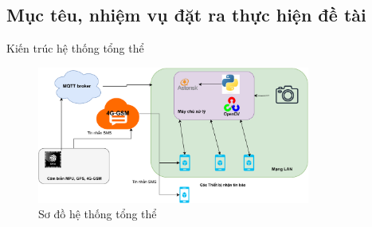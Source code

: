 \subsection{Mục têu, nhiệm vụ đặt ra thực hiện đề tài}

\begin{frame}{Kiến trúc hệ thống tổng thể}
    \begin{figure}
        \centering
        \includegraphics[width=0.8\textwidth]{images/resuilt_structure_diagram.pdf}
        \caption{Sơ đồ hệ thống tổng thể}
    \end{figure}
\end{frame}

